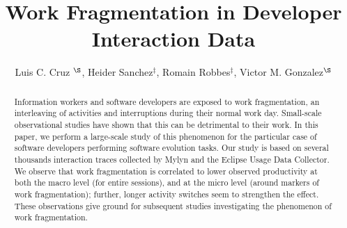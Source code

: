 \documentclass[times]{smrauth}
\begin{document}
	
	
%


\title{ Work Fragmentation in Developer Interaction Data}

\author{Luis C. Cruz $^{\S}$, Heider Sanchez$^{\ddagger}$, Romain Robbes$^{\ddagger}$, Victor M. Gonzalez$^{\S}$}

\address{$^{\ddagger}$: Computer Science Department (DCC), University of Chile, Chile;
$^{\S}$: Instituto Tecnologico Autonomo de Mexico, Mexico}


\maketitle





\begin{abstract}
		
Information workers and software developers are exposed to work fragmentation, an interleaving of activities and interruptions during their normal work day. Small-scale observational studies have shown that this can be detrimental to their work. In this paper, we perform a large-scale study of this phenomenon for the particular case of software developers performing software evolution tasks. Our study is based on several thousands interaction traces collected by Mylyn and the Eclipse Usage Data Collector. We observe that work fragmentation is correlated to lower observed productivity at both the macro level (for entire sessions), and at the micro level (around markers of work fragmentation); further, longer activity switches seem to strengthen the effect. These observations give ground for subsequent studies investigating the phenomenon of work fragmentation.
\end{abstract}


\end{document}

